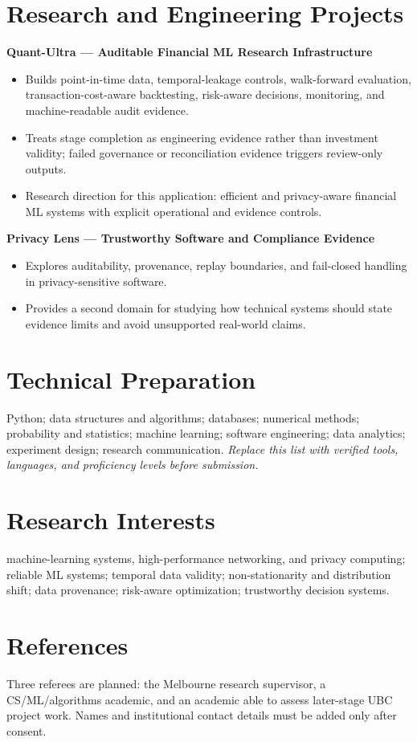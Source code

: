 \documentclass[11pt]{article}
\begin{document}
\section*{Research and Engineering Projects}
\textbf{Quant-Ultra --- Auditable Financial ML Research Infrastructure}
\begin{itemize}
\item Builds point-in-time data, temporal-leakage controls, walk-forward evaluation, transaction-cost-aware backtesting, risk-aware decisions, monitoring, and machine-readable audit evidence.
\item Treats stage completion as engineering evidence rather than investment validity; failed governance or reconciliation evidence triggers review-only outputs.
\item Research direction for this application: efficient and privacy-aware financial ML systems with explicit operational and evidence controls.
\end{itemize}

\textbf{Privacy Lens --- Trustworthy Software and Compliance Evidence}
\begin{itemize}
\item Explores auditability, provenance, replay boundaries, and fail-closed handling in privacy-sensitive software.
\item Provides a second domain for studying how technical systems should state evidence limits and avoid unsupported real-world claims.
\end{itemize}

\section*{Technical Preparation}
Python; data structures and algorithms; databases; numerical methods; probability and statistics; machine learning; software engineering; data analytics; experiment design; research communication. \textit{Replace this list with verified tools, languages, and proficiency levels before submission.}

\section*{Research Interests}
machine-learning systems, high-performance networking, and privacy computing; reliable ML systems; temporal data validity; non-stationarity and distribution shift; data provenance; risk-aware optimization; trustworthy decision systems.

\section*{References}
Three referees are planned: the Melbourne research supervisor, a CS/ML/algorithms academic, and an academic able to assess later-stage UBC project work. Names and institutional contact details must be added only after consent.
\end{document}
